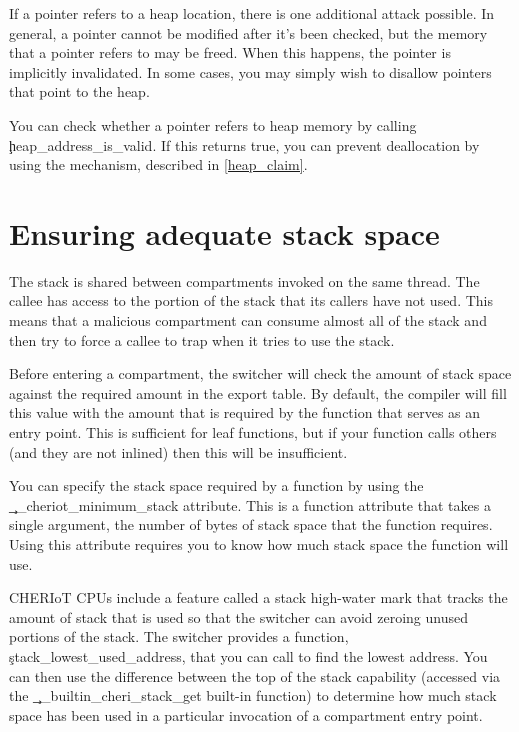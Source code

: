 If a pointer refers to a heap location, there is one additional attack possible.
In general, a pointer cannot be modified after it's been checked, but the memory that a pointer refers to may be freed.
When this happens, the pointer is implicitly invalidated.
In some cases, you may simply wish to disallow pointers that point to the heap.

You can check whether a pointer refers to heap memory by calling \c{heap_address_is_valid}.
If this returns true, you can prevent deallocation by using the  mechanism, described in \ref{heap_claim}.


\section{Ensuring adequate stack space}

The stack is shared between compartments invoked on the same thread.
The callee has access to the portion of the stack that its callers have not used.
This means that a malicious compartment can consume almost all of the stack and then try to force a callee to trap when it tries to use the stack.

Before entering a compartment, the switcher will check the amount of stack space against the required amount in the export table.
By default, the compiler will fill this value with the amount that is required by the function that serves as an entry point.
This is sufficient for leaf functions, but if your function calls others (and they are not inlined) then this will be insufficient.

You can specify the stack space required by a function by using the \c{__cheriot_minimum_stack} attribute.
This is a function attribute that takes a single argument, the number of bytes of stack space that the function requires.
Using this attribute requires you to know how much stack space the function will use.

CHERIoT CPUs include a feature called a stack high-water mark that tracks the amount of stack that is used so that the switcher can avoid zeroing unused portions of the stack.
The switcher provides a function, \c{stack_lowest_used_address}, that you can call to find the lowest address.
You can then use the difference between the top of the stack capability (accessed via the \c{__builtin_cheri_stack_get} built-in function) to determine how much stack space has been used in a particular invocation of a compartment entry point.

